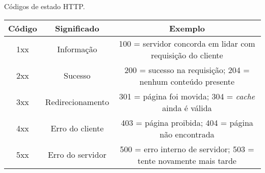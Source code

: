 \begin{quadro}[!htb]
	\centering
	\caption{Códigos de estado HTTP.\label{qua:estadoshttp}}
	\begin{tabular}{| c | c | c |}
		\hline
		\textbf{Código} & \textbf{Significado} & \multicolumn{1}{c}{\textbf{Exemplo}}                             \\
		\hline
		1xx             & Informação           & 100 = servidor concorda em lidar com requisição do cliente       \\
		\hline
		2xx             & Sucesso              & 200 = sucesso na requisição; 204 = nenhum conteúdo presente      \\
		\hline
		3xx             & Redirecionamento     & 301 = página foi movida; 304 = \textit{cache} ainda é válida              \\
		\hline
		4xx             & Erro do cliente      & 403 = página proibida; 404 = página não encontrada               \\
		\hline
		5xx             & Erro do servidor     & 500 = erro interno de servidor; 503 = tente novamente mais tarde \\
		\hline
	\end{tabular}
\end{quadro}